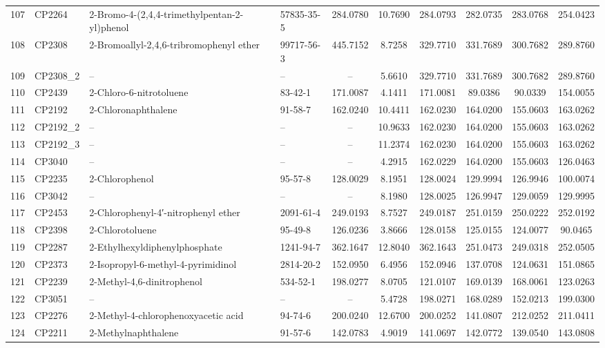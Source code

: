 \begin{longtable}{clllcccccc}
107 & CP2264 & 2-Bromo-4-(2,4,4-trimethylpentan-2-yl)phenol & 57835-35-5 & 284.0780 & 10.7690 & 284.0793 & 282.0735 & 283.0768 & 254.0423 \\ 
108 & CP2308 & 2-Bromoallyl-2,4,6-tribromophenyl ether & 99717-56-3 & 445.7152 & 8.7258 & 329.7710 & 331.7689 & 300.7682 & 289.8760 \\ 
109 & CP2308\_2 & – & – & – & 5.6610 & 329.7710 & 331.7689 & 300.7682 & 289.8760 \\ 
110 & CP2439 & 2-Chloro-6-nitrotoluene & 83-42-1 & 171.0087 & 4.1411 & 171.0081 & 89.0386 & 90.0339 & 154.0055 \\ 
111 & CP2192 & 2-Chloronaphthalene & 91-58-7 & 162.0240 & 10.4411 & 162.0230 & 164.0200 & 155.0603 & 163.0262 \\ 
112 & CP2192\_2 & – & – & – & 10.9633 & 162.0230 & 164.0200 & 155.0603 & 163.0262 \\ 
113 & CP2192\_3 & – & – & – & 11.2374 & 162.0230 & 164.0200 & 155.0603 & 163.0262 \\ 
114 & CP3040 & – & – & – & 4.2915 & 162.0229 & 164.0200 & 155.0603 & 126.0463 \\ 
115 & CP2235 & 2-Chlorophenol & 95-57-8 & 128.0029 & 8.1951 & 128.0024 & 129.9994 & 126.9946 & 100.0074 \\ 
116 & CP3042 & – & – & – & 8.1980 & 128.0025 & 126.9947 & 129.0059 & 129.9995 \\ 
117 & CP2453 & 2-Chlorophenyl-4′-nitrophenyl ether & 2091-61-4 & 249.0193 & 8.7527 & 249.0187 & 251.0159 & 250.0222 & 252.0192 \\ 
118 & CP2398 & 2-Chlorotoluene & 95-49-8 & 126.0236 & 3.8666 & 128.0158 & 125.0155 & 124.0077 & 90.0465 \\ 
119 & CP2287 & 2-Ethylhexyldiphenylphosphate & 1241-94-7 & 362.1647 & 12.8040 & 362.1643 & 251.0473 & 249.0318 & 252.0505 \\ 
120 & CP2373 & 2-Isopropyl-6-methyl-4-pyrimidinol & 2814-20-2 & 152.0950 & 6.4956 & 152.0946 & 137.0708 & 124.0631 & 151.0865 \\ 
121 & CP2239 & 2-Methyl-4,6-dinitrophenol & 534-52-1 & 198.0277 & 8.0705 & 121.0107 & 169.0139 & 168.0061 & 123.0263 \\ 
122 & CP3051 & – & – & – & 5.4728 & 198.0271 & 168.0289 & 152.0213 & 199.0300 \\ 
123 & CP2276 & 2-Methyl-4-chlorophenoxyacetic acid & 94-74-6 & 200.0240 & 12.6700 & 200.0252 & 141.0807 & 212.0252 & 211.0411 \\ 
124 & CP2211 & 2-Methylnaphthalene & 91-57-6 & 142.0783 & 4.9019 & 141.0697 & 142.0772 & 139.0540 & 143.0808 \\ 

\end{longtable}

